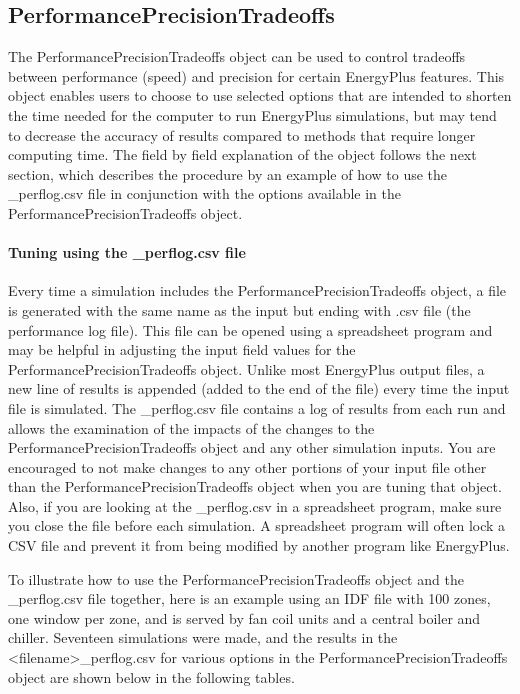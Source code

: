 \subsection{PerformancePrecisionTradeoffs}\label{performanceprecisiontradeoffs}

The PerformancePrecisionTradeoffs object can be used to control tradeoffs between performance (speed) and precision for certain EnergyPlus features. This object enables users to choose to use selected options that are intended to shorten the time needed for the computer to run EnergyPlus simulations, but may tend to decrease the accuracy of results compared to methods that require longer computing time. The field by field explanation of the object follows the next section, which describes the procedure by an example of how to use the \_perflog.csv file in conjunction with the options available in the PerformancePrecisionTradeoffs object.

\paragraph{Tuning using the \_perflog.csv file}\label{tuning-using-perlog-csv-file}

Every time a simulation includes the PerformancePrecisionTradeoffs object, a file is generated with the same name as the input but ending with \erflog.csv file (the performance log file). This file can be opened using a spreadsheet program and may be helpful in adjusting the input field values for the PerformancePrecisionTradeoffs object. Unlike most EnergyPlus output files, a new line of results is appended (added to the end of the file) every time the input file is simulated. The \_perflog.csv file contains a log of results from each run and allows the examination of the impacts of the changes to the PerformancePrecisionTradeoffs object and any other simulation inputs. You are encouraged to not make changes to any other portions of your input file other than the PerformancePrecisionTradeoffs object when you are tuning that object. Also, if you are looking at the \_perflog.csv in a spreadsheet program, make sure you close the file before each simulation. A spreadsheet program will often lock a CSV file and prevent it from being modified by another program like EnergyPlus.

To illustrate how to use the PerformancePrecisionTradeoffs object and the \_perflog.csv file together, here is an example using an IDF file with 100 zones, one window per zone, and is served by fan coil units and a central boiler and chiller. Seventeen simulations were made, and the results in the <filename>\_perflog.csv for various options in the PerformancePrecisionTradeoffs object are shown below in the following tables.


